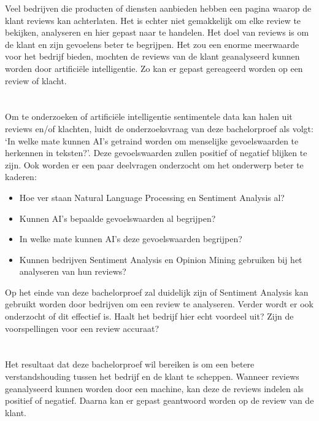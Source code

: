Veel bedrijven die producten of diensten aanbieden hebben een pagina waarop de klant reviews kan achterlaten. Het is echter niet gemakkelijk om elke review te bekijken, analyseren en hier gepast naar te handelen. Het doel van reviews is om de klant en zijn gevoelens beter te begrijpen. Het zou een enorme meerwaarde voor het bedrijf bieden, mochten de reviews van de klant geanalyseerd kunnen worden door artificiële intelligentie. Zo kan er gepast gereageerd worden op een review of klacht. 

\section{}
\label{sec:onderzoeksvraag}

Om te onderzoeken of artificiële intelligentie sentimentele data kan halen uit reviews en/of klachten, luidt de onderzoeksvraag van deze bachelorproef als volgt: `In welke mate kunnen AI’s getraind worden om menselijke gevoelswaarden te herkennen in teksten?'. Deze gevoelswaarden zullen positief of negatief blijken te zijn. Ook worden er een paar deelvragen onderzocht om het onderwerp beter te kaderen:

\begin{itemize}
    \item Hoe ver staan Natural Language Processing en Sentiment Analysis al?
    \item Kunnen AI's bepaalde gevoelswaarden al begrijpen?
    \item In welke mate kunnen AI's deze gevoelswaarden begrijpen?
    \item Kunnen bedrijven Sentiment Analysis en Opinion Mining gebruiken bij het analyseren van hun reviews?
\end{itemize}

Op het einde van deze bachelorproef zal duidelijk zijn of Sentiment Analysis kan gebruikt worden door bedrijven om een review te analyseren. Verder wordt er ook onderzocht of dit effectief is. Haalt het bedrijf hier echt voordeel uit? Zijn de voorspellingen voor een review accuraat?


\section{}
\label{sec:onderzoeksdoelstelling}

Het resultaat dat deze bachelorproef wil bereiken is om een betere verstandshouding tussen het bedrijf en de klant te scheppen. Wanneer reviews geanalyseerd kunnen worden door een machine, kan deze de reviews indelen als positief of negatief. Daarna kan er gepast geantwoord worden op de review van de klant. 

